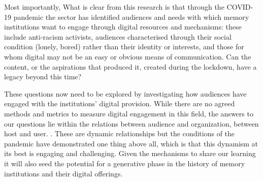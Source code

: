 \documentclass{egpubl}
\begin{document}
Most importantly, What is clear from this research is that through the COVID-19 pandemic the sector has identified audiences and needs with which memory institutions want to engage through digital resources and mechanisms: these include anti-racism activists, audiences characterised through their social condition (lonely, bored) rather than their identity or interests, and those for whom digital may not be an easy or obvious means of communication. Can the content, or the aspirations that produced it, created during the lockdown, have a legacy beyond this time? 

These questions now need to be explored by investigating how audiences have engaged with the institutions' digital provision. While there are no agreed methods and metrics to measure digital engagement in this field, the answers to our questions lie within the relations between audience and organization, between host and user.  \cite{NetworkofEuropeanMuseumOrganisations20202}. These are dynamic relationships but the conditions of the pandemic have demonstrated one thing above all, which is that this dynamism at its best is engaging and challenging. Given the mechanisms to share our learning it will also seed the potential for a generative phase in the history of memory institutions and their digital offerings.  


\end{document}
